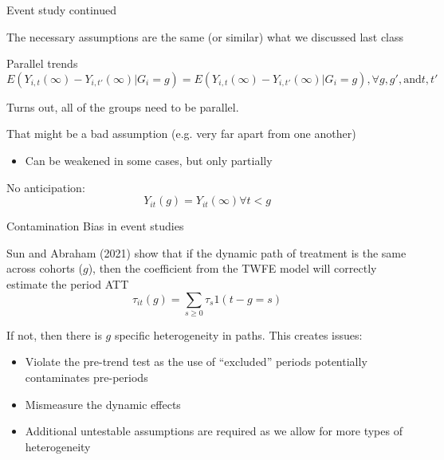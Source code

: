 \documentclass[notes,11pt, aspectratio=169]{beamer}
\newenvironment{wideitemize}{\itemize\addtolength{\itemsep}{10pt}}{\enditemize}
\begin{document}
\begin{frame}{Event study continued}
	\begin{wideitemize}
		\item The necessary assumptions are the same (or similar) what we discussed last class
		\item Parallel trends
		\begin{equation}
			E(Y_{i,t}(\infty) - Y_{i,t'}(\infty) | G_{i} = g) =       E(Y_{i,t}(\infty) - Y_{i,t'}(\infty) | G_{i} = g) , \forall g, g', \text{and} t, t'
		\end{equation}
		\item Turns out, all of the groups need to be parallel.
		\item That might be a bad assumption (e.g. very far apart from
		one another)
		\begin{itemize}
			\item Can be weakened in some cases, but only partially
		\end{itemize}
		\item No anticipation:
		\begin{equation}
			Y_{it}(g) = Y_{it}(\infty) \forall t < g
		\end{equation}
	\end{wideitemize}
\end{frame}

\begin{frame}{Contamination Bias in event studies}
	\begin{wideitemize}
		\item Sun and Abraham (2021) show that if the dynamic path of
		treatment is the same across cohorts ($g$), then the coefficient
		from the TWFE model will correctly estimate the period ATT
		$$\tau_{it}(g)  = \sum_{s\geq0}\tau_{s}1(t-g = s)$$
		\item If not, then there is $g$ specific heterogeneity in paths. This creates issues:
		\begin{itemize}
			\item Violate the pre-trend test as the use of ``excluded''
			      periods potentially contaminates pre-periods
			\item Mismeasure the dynamic effects
			\item Additional untestable assumptions are required as we allow for more types of heterogeneity
		\end{itemize}
	\end{wideitemize}
\end{frame}
\end{document}
